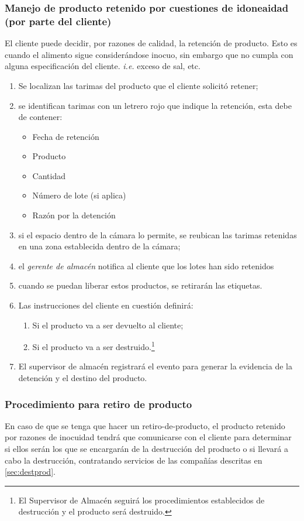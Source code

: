 \subsubsection{Manejo de producto retenido por cuestiones de idoneaidad (por parte del cliente)}
El cliente puede decidir, por razones de calidad, la retención de producto. Esto es cuando el alimento sigue considerándose inocuo, sin embargo que no cumpla con alguna especificación del cliente. \textit{i.e.} exceso de sal, etc. 

\begin{enumerate}
	\item Se localizan las tarimas del producto que el cliente solicitó retener;
	\item se identifican tarimas con un letrero rojo que indique la retención, esta debe de contener:
		\begin{itemize}
		\item Fecha de retención
		\item Producto
		\item Cantidad
		\item Número de lote (si aplica)
		\item Razón por la detención
		\end{itemize}
	\item si el espacio dentro de la cámara lo permite, se reubican las tarimas retenidas en una zona establecida dentro de la cámara;
	\item el \emph{gerente de almacén} notifica al cliente que los lotes han sido retenidos
	\item cuando se puedan liberar estos productos, se retirarán las etiquetas.
	\item Las instrucciones del cliente en cuestión definirá:
	\begin{enumerate}
		\item Si el producto va a ser devuelto al cliente;
		\item Si el producto va a ser destruido.\footnote{El Supervisor de Almacén seguirá los procedimientos establecidos de destrucción y el producto será destruido.}
	\end{enumerate}
	\item El supervisor de almacén registrará el evento para generar la evidencia de la detención y el destino del producto.
\end{enumerate}

\subsubsection{Procedimiento para retiro de producto}
En caso de que se tenga que hacer un \gls{retiro-de-producto}, el producto retenido por razones de inocuidad tendrá que comunicarse con el cliente para determinar si ellos serán los que se encargarán de la destrucción del producto o si  llevará a cabo la destrucción, contratando servicios de las compañías descritas en \cref{sec:destprod}.

